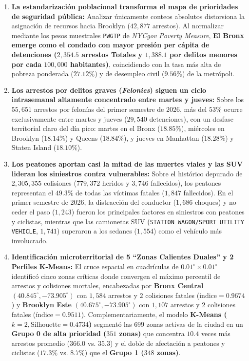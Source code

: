 \begin{enumerate}
    \item \textbf{La estandarización poblacional transforma el mapa de prioridades de seguridad pública:}
    Analizar únicamente conteos absolutos distorsiona la asignación de recursos hacia Brooklyn ($42,877$ arrestos). Al normalizar mediante los pesos muestrales \texttt{PWGTP} de \textit{NYCgov Poverty Measure}, \textbf{El Bronx emerge como el condado con mayor presión per cápita de detenciones ($2,354.5$ arrestos Totales y $1,388.1$ por delitos menores por cada $100,000$ habitantes)}, coincidiendo con la tasa más alta de pobreza ponderada ($27.12\%$) y de desempleo civil ($9.56\%$) de la metrópoli.

    \item \textbf{Los arrestos por delitos graves (\textit{Felonies}) siguen un ciclo intrasemanal altamente concentrado entre martes y jueves:}
    Sobre los $55,651$ arrestos por felonías del primer semestre de 2026, más del $53\%$ ocurre exclusivamente entre martes y jueves ($29,540$ detenciones), con un desfase territorial claro del día pico: martes en el Bronx ($18.85\%$), miércoles en Brooklyn ($18.14\%$) y Queens ($18.84\%$), y jueves en Manhattan ($18.28\%$) y Staten Island ($18.10\%$).

    \item \textbf{Los peatones aportan casi la mitad de las muertes viales y las SUV lideran los siniestros contra vulnerables:}
    Sobre el histórico depurado de $2,305,355$ colisiones ($779,372$ heridos y $3,746$ fallecidos), los peatones representan el $49.3\%$ de todas las víctimas fatales ($1,847$ fallecidos). En el primer semestre de 2026, la distracción del conductor ($1,686$ choques) y no ceder el paso ($1,243$) fueron los principales factores en siniestros con peatones y ciclistas, mientras que las camionetas SUV (\texttt{STATION WAGON/SPORT UTILITY VEHICLE}, $1,741$) superaron a los sedanes ($1,554$) como el vehículo más involucrado.

    \item \textbf{Identificación microterritorial de 5 ``Zonas Calientes Duales'' y 2 Perfiles K-Means:}
    El cruce espacial en cuadrículas de $0.01^\circ \times 0.01^\circ$ identificó cinco zonas críticas donde convergen el máximo percentil de arrestos y colisiones mortales, encabezadas por \textbf{Bronx Central} $(40.845^\circ, -73.905^\circ)$ con $1,584$ arrestos y $2$ colisiones fatales ($\text{índice} = 0.9674$) y \textbf{Brooklyn Este} $(40.675^\circ, -73.905^\circ)$ con $1,107$ arrestos y $2$ colisiones fatales ($\text{índice} = 0.9511$). Complementariamente, el modelo \textbf{K-Means ($k=2, \text{Silhouette}=0.4734$)} segmentó las $699$ zonas activas de la ciudad en un \textbf{Grupo 0 de alta prioridad ($351$ zonas)} que concentra $10.4$ veces más arrestos promedio ($366.0$ vs. $35.3$) y el doble de afectación a peatones y ciclistas ($17.3\%$ vs. $8.7\%$) que el \textbf{Grupo 1 ($348$ zonas)}.


\end{enumerate}
